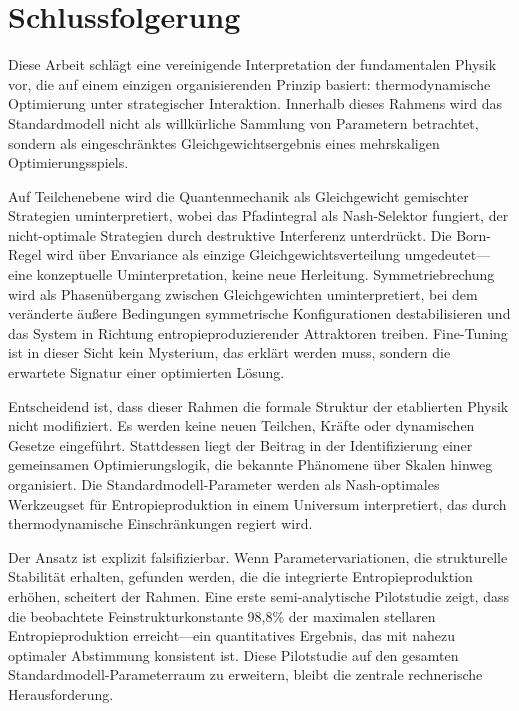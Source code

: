 \documentclass[12pt,a4paper]{article}
\theoremstyle{remark}
\begin{document}
\section{Schlussfolgerung}
\label{sec:conclusion}

Diese Arbeit schl\"agt eine vereinigende Interpretation der fundamentalen Physik vor, die auf einem einzigen organisierenden Prinzip basiert: thermodynamische Optimierung unter strategischer Interaktion. Innerhalb dieses Rahmens wird das Standardmodell nicht als willk\"urliche Sammlung von Parametern betrachtet, sondern als eingeschr\"anktes Gleichgewichtsergebnis eines mehrskaligen Optimierungsspiels.

Auf Teilchenebene wird die Quantenmechanik als Gleichgewicht gemischter Strategien uminterpretiert, wobei das Pfadintegral als Nash-Selektor fungiert, der nicht-optimale Strategien durch destruktive Interferenz unterdr\"uckt. Die Born-Regel wird \"uber Envariance als einzige Gleichgewichtsverteilung umgedeutet---eine konzeptuelle Uminterpretation, keine neue Herleitung. Symmetriebrechung wird als Phasen\"ubergang zwischen Gleichgewichten uminterpretiert, bei dem ver\"anderte \"au\ss{}ere Bedingungen symmetrische Konfigurationen destabilisieren und das System in Richtung entropieproduzierender Attraktoren treiben. Fine-Tuning ist in dieser Sicht kein Mysterium, das erkl\"art werden muss, sondern die erwartete Signatur einer optimierten L\"osung.

Entscheidend ist, dass dieser Rahmen die formale Struktur der etablierten Physik nicht modifiziert. Es werden keine neuen Teilchen, Kr\"afte oder dynamischen Gesetze eingef\"uhrt. Stattdessen liegt der Beitrag in der Identifizierung einer gemeinsamen Optimierungslogik, die bekannte Ph\"anomene \"uber Skalen hinweg organisiert. Die Standardmodell-Parameter werden als Nash-optimales Werkzeugset f\"ur Entropieproduktion in einem Universum interpretiert, das durch thermodynamische Einschr\"ankungen regiert wird.

Der Ansatz ist explizit falsifizierbar. Wenn Parametervariationen, die strukturelle Stabilit\"at erhalten, gefunden werden, die die integrierte Entropieproduktion erh\"ohen, scheitert der Rahmen. Eine erste semi-analytische Pilotstudie zeigt, dass die beobachtete Feinstrukturkonstante 98,8\% der maximalen stellaren Entropieproduktion erreicht---ein quantitatives Ergebnis, das mit nahezu optimaler Abstimmung konsistent ist. Diese Pilotstudie auf den gesamten Standardmodell-Parameterraum zu erweitern, bleibt die zentrale rechnerische Herausforderung.
\end{document}
